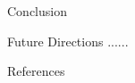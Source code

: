 \documentclass[final]{beamer}
\newlength{\sepwidth}
\newlength{\colwidth}
\newcommand{\separatorcolumn}{\begin{column}{\sepwidth}\end{column}}
\begin{document}
\begin{frame}[t]
\begin{columns}[t]
\begin{column}{\colwidth}
\begin{block}{Conclusion}
  \end{block}

  \begin{block}{Future Directions}
......

  \end{block}

  
  \begin{block}{References}

    \nocite{*}
    \footnotesize{}

  \end{block}

\end{column}

\separatorcolumn
\end{columns}
\end{frame}
\end{document}
